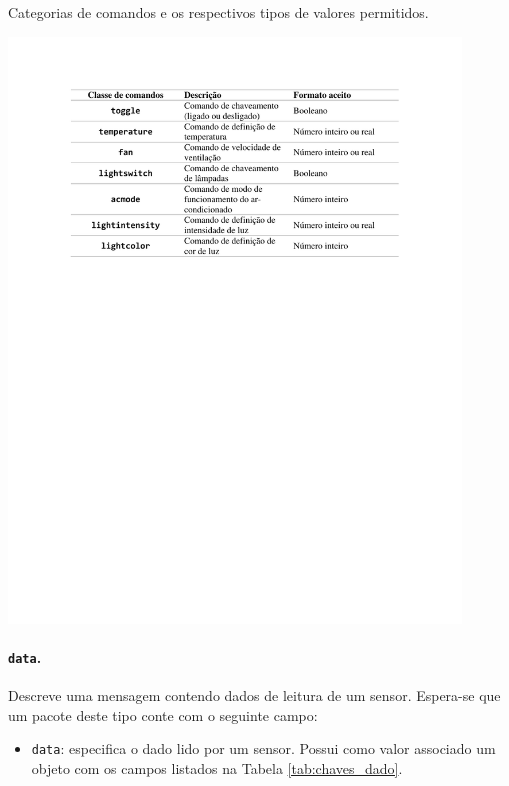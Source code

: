 \begin{table}[hp]
	\caption{Categorias de comandos e os respectivos tipos de valores permitidos.}\smallskip
	\label{tab:classescomandos}
	\includegraphics[width=0.9\textwidth]{tabelas/classes_comandos.pdf}
\end{table}

\paragraph*{\texttt{data}.} Descreve uma mensagem contendo dados de leitura de um sensor. Espera-se que um pacote deste tipo conte com o seguinte campo:
\begin{itemize}
	\item \texttt{data}: especifica o dado lido por um sensor. Possui como valor associado um objeto com os campos listados na Tabela \ref{tab:chaves_dado}.
\end{itemize}

